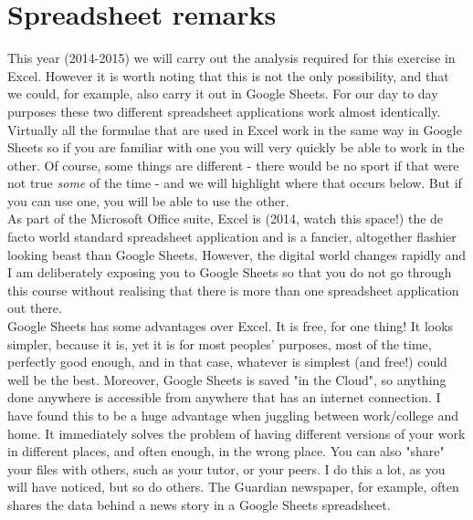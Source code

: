 \documentclass{article}
\begin{document}
\section{Spreadsheet remarks}


This year (2014-2015) we will carry out the analysis required for this exercise in Excel. However it is worth noting that this is not the only possibility, and that we could, for example, also carry it out in Google Sheets. For our day to day purposes these two different spreadsheet applications work almost identically. Virtually all the formulae that are used in Excel work in the same way in Google Sheets so if you are familiar with one you will very quickly be able to work in the other. Of course, some things are different - there would be no sport if that were not true \textit{some} of the time - and we will highlight where that occurs below. But if you can use one, you will be able to use the other.\\

As part of the Microsoft Office suite, Excel is (2014, watch this space!) the de facto world standard spreadsheet application and is a fancier, altogether flashier looking beast than Google Sheets. However, the digital world changes rapidly and I am deliberately exposing you to Google Sheets so that you do not go through this course without realising that there is more than one spreadsheet application out there.\\

Google Sheets has some advantages over Excel. It is free, for one thing! It looks simpler, because it is, yet it is for most peoples' purposes, most of the time, perfectly good enough, and in that case, whatever is simplest (and free!) could well be the best. Moreover, Google Sheets is saved "in the Cloud", so anything done anywhere is accessible from anywhere that has an internet connection. I have found this to be a huge advantage when juggling between work/college and home. It immediately solves the problem of having different versions of your work in different places, and often enough, in the wrong place. You can also "share" your files with others, such as your tutor, or your peers. I do this a lot, as you will have noticed, but so do others. The Guardian newspaper, for example, often shares the data behind a news story in a Google Sheets spreadsheet.\\

\end{document}
